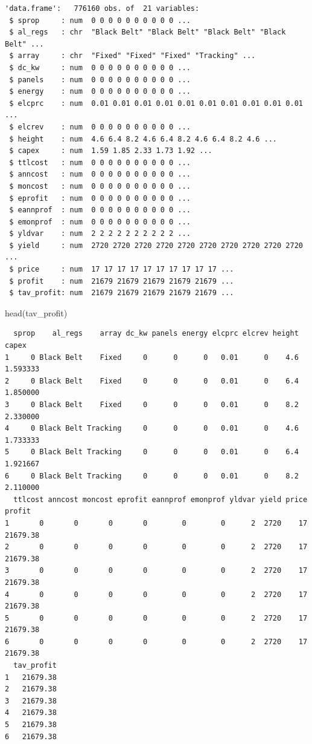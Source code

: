 \documentclass[
  letterpaper,
  DIV=11,
  numbers=noendperiod]{scrartcl}
\newenvironment{Shaded}{\begin{snugshade}}{\end{snugshade}}
\newcommand{\FunctionTok}[1]{\textcolor[rgb]{0.28,0.35,0.67}{#1}}
\newcommand{\NormalTok}[1]{\textcolor[rgb]{0.00,0.23,0.31}{#1}}
\begin{document}
\begin{verbatim}
'data.frame':   776160 obs. of  21 variables:
 $ sprop     : num  0 0 0 0 0 0 0 0 0 0 ...
 $ al_regs   : chr  "Black Belt" "Black Belt" "Black Belt" "Black Belt" ...
 $ array     : chr  "Fixed" "Fixed" "Fixed" "Tracking" ...
 $ dc_kw     : num  0 0 0 0 0 0 0 0 0 0 ...
 $ panels    : num  0 0 0 0 0 0 0 0 0 0 ...
 $ energy    : num  0 0 0 0 0 0 0 0 0 0 ...
 $ elcprc    : num  0.01 0.01 0.01 0.01 0.01 0.01 0.01 0.01 0.01 0.01 ...
 $ elcrev    : num  0 0 0 0 0 0 0 0 0 0 ...
 $ height    : num  4.6 6.4 8.2 4.6 6.4 8.2 4.6 6.4 8.2 4.6 ...
 $ capex     : num  1.59 1.85 2.33 1.73 1.92 ...
 $ ttlcost   : num  0 0 0 0 0 0 0 0 0 0 ...
 $ anncost   : num  0 0 0 0 0 0 0 0 0 0 ...
 $ moncost   : num  0 0 0 0 0 0 0 0 0 0 ...
 $ eprofit   : num  0 0 0 0 0 0 0 0 0 0 ...
 $ eannprof  : num  0 0 0 0 0 0 0 0 0 0 ...
 $ emonprof  : num  0 0 0 0 0 0 0 0 0 0 ...
 $ yldvar    : num  2 2 2 2 2 2 2 2 2 2 ...
 $ yield     : num  2720 2720 2720 2720 2720 2720 2720 2720 2720 2720 ...
 $ price     : num  17 17 17 17 17 17 17 17 17 17 ...
 $ profit    : num  21679 21679 21679 21679 21679 ...
 $ tav_profit: num  21679 21679 21679 21679 21679 ...
\end{verbatim}

\begin{Shaded}
\begin{Highlighting}[]
\FunctionTok{head}\NormalTok{(tav\_profit)}
\end{Highlighting}
\end{Shaded}

\begin{verbatim}
  sprop    al_regs    array dc_kw panels energy elcprc elcrev height    capex
1     0 Black Belt    Fixed     0      0      0   0.01      0    4.6 1.593333
2     0 Black Belt    Fixed     0      0      0   0.01      0    6.4 1.850000
3     0 Black Belt    Fixed     0      0      0   0.01      0    8.2 2.330000
4     0 Black Belt Tracking     0      0      0   0.01      0    4.6 1.733333
5     0 Black Belt Tracking     0      0      0   0.01      0    6.4 1.921667
6     0 Black Belt Tracking     0      0      0   0.01      0    8.2 2.110000
  ttlcost anncost moncost eprofit eannprof emonprof yldvar yield price   profit
1       0       0       0       0        0        0      2  2720    17 21679.38
2       0       0       0       0        0        0      2  2720    17 21679.38
3       0       0       0       0        0        0      2  2720    17 21679.38
4       0       0       0       0        0        0      2  2720    17 21679.38
5       0       0       0       0        0        0      2  2720    17 21679.38
6       0       0       0       0        0        0      2  2720    17 21679.38
  tav_profit
1   21679.38
2   21679.38
3   21679.38
4   21679.38
5   21679.38
6   21679.38
\end{verbatim}
\end{document}
